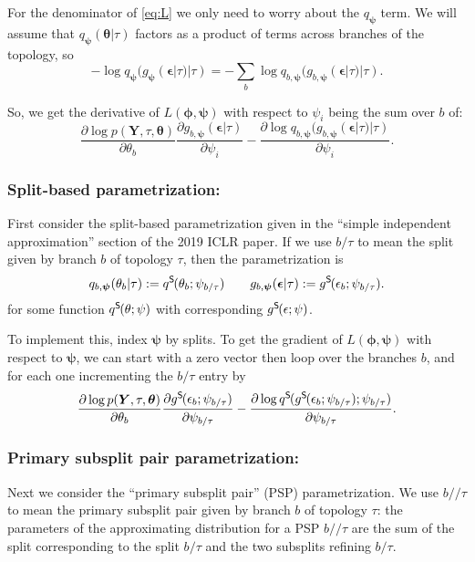 \documentclass{article}
\newcommand{\psp}{\slash\!\!\slash}
\newcommand{\qSplit}{q^\textsf{S}\hspace{-1pt}}
\newcommand{\gSplit}{g^\textsf{S}\hspace{-1pt}}
\begin{document}
For the denominator of \eqref{eq:L} we only need to worry about the $q_{\bm\psi}$ term.
We will assume that $q_{\bm\psi}(\bm\theta | \tau)$ factors as a product of terms across branches of the topology, so
\[
    - \log q_{\bm{\psi}}(g_{\bm{\psi}}(\bm{\epsilon}|\tau)|\tau) =
    - \sum_b \log q_{b, \bm{\psi}}(g_{b, \bm{\psi}}(\bm{\epsilon}|\tau)|\tau).
\]

So, we get the derivative of $L(\bm\phi, \bm\psi)$ with respect to $\psi_i$ being the sum over $b$ of:
\begin{equation}
    \frac{\partial \log p(\bm{Y}, \tau, \bm\theta)}{\partial \theta_b}
    \frac{\partial g_{b,\bm\psi}(\bm\epsilon | \tau)}{\partial \psi_i}
    - \frac{\partial \log q_{b, \bm\psi}(g_{b, \bm\psi}(\bm\epsilon|\tau)|\tau)}{\partial \psi_i}.
    \label{eq:dLdPsi}
\end{equation}

\subsubsection*{Split-based parametrization:}
First consider the split-based parametrization given in the ``simple independent approximation'' section of the 2019 ICLR paper.
If we use $b \slash \tau$ to mean the split given by branch $b$ of topology $\tau$, then the parametrization is
\[
q_{b, \bm{\psi}}(\theta_b | \tau) := \qSplit(\theta_b; \psi_{b \slash \tau})
\qquad
g_{b,\bm\psi}(\bm\epsilon | \tau) := \gSplit(\epsilon_b; \psi_{b \slash \tau}).
\]
for some function $\qSplit(\theta; \psi)$ with corresponding $\gSplit(\epsilon; \psi)$.

To implement this, index $\bm\psi$ by splits.
To get the gradient of $L(\bm\phi, \bm\psi)$ with respect to $\bm\psi$, we can start with a zero vector then loop over the branches $b$, and for each one incrementing the $b \slash \tau$ entry by
\begin{equation*}
    \frac{\partial \log p(\bm{Y}, \tau, \bm\theta)}{\partial \theta_b}
    \frac{\partial \gSplit(\epsilon_b; \psi_{b \slash \tau})}{\partial \psi_{b \slash \tau}}
    - \frac{\partial \log \qSplit(\gSplit(\epsilon_b; \psi_{b \slash \tau}); \psi_{b \slash \tau})}{\partial \psi_{b \slash \tau}}.
\end{equation*}


\subsubsection*{Primary subsplit pair parametrization:}
Next we consider the ``primary subsplit pair'' (PSP) parametrization.
We use $b \psp \tau$ to mean the primary subsplit pair given by branch $b$ of topology $\tau$: the parameters of the approximating distribution for a PSP $b \psp \tau$ are the sum of the split corresponding to the split $b \slash \tau$ and the two subsplits refining $b \slash \tau$.
\end{document}
